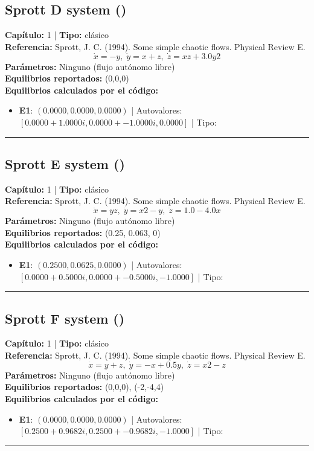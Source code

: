 \subsection*{Sprott D system ()}
\textbf{Capítulo:} 1 | \textbf{Tipo:} clásico\\
\textbf{Referencia:} Sprott, J. C. (1994). Some simple chaotic flows. Physical Review E.\\
\[\dot{x}=-y, \; \dot{y}=x+z, \; \dot{z}=xz+3.0y2\]
\textbf{Parámetros:} Ninguno (flujo autónomo libre)\\
\textbf{Equilibrios reportados:} (0,0,0)\\
\textbf{Equilibrios calculados por el código:}
\begin{itemize}
  \item \textbf{E1}: $(0.0000, 0.0000, 0.0000)$ | Autovalores: $[0.0000 + 1.0000i, 0.0000 + -1.0000i, 0.0000]$ | Tipo: 
\end{itemize}
\hrule

\subsection*{Sprott E system ()}
\textbf{Capítulo:} 1 | \textbf{Tipo:} clásico\\
\textbf{Referencia:} Sprott, J. C. (1994). Some simple chaotic flows. Physical Review E.\\
\[\dot{x}=yz, \; \dot{y}=x2-y, \; \dot{z}=1.0-4.0x\]
\textbf{Parámetros:} Ninguno (flujo autónomo libre)\\
\textbf{Equilibrios reportados:} (0.25, 0.063, 0)\\
\textbf{Equilibrios calculados por el código:}
\begin{itemize}
  \item \textbf{E1}: $(0.2500, 0.0625, 0.0000)$ | Autovalores: $[0.0000 + 0.5000i, 0.0000 + -0.5000i, -1.0000]$ | Tipo: 
\end{itemize}
\hrule

\subsection*{Sprott F system ()}
\textbf{Capítulo:} 1 | \textbf{Tipo:} clásico\\
\textbf{Referencia:} Sprott, J. C. (1994). Some simple chaotic flows. Physical Review E.\\
\[\dot{x}=y+z, \; \dot{y}=-x+0.5y, \; \dot{z}=x2-z\]
\textbf{Parámetros:} Ninguno (flujo autónomo libre)\\
\textbf{Equilibrios reportados:} (0,0,0), (-2,-4,4)\\
\textbf{Equilibrios calculados por el código:}
\begin{itemize}
  \item \textbf{E1}: $(0.0000, 0.0000, 0.0000)$ | Autovalores: $[0.2500 + 0.9682i, 0.2500 + -0.9682i, -1.0000]$ | Tipo: 
\end{itemize}
\hrule

